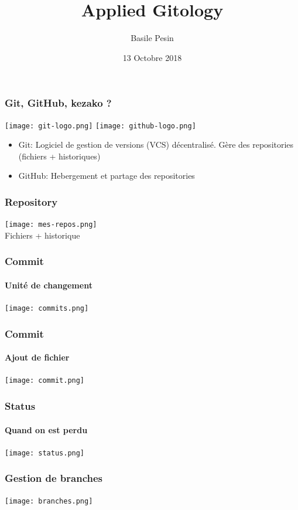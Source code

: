 \documentclass[aspectratio=169]{beamer}
\title{Applied Gitology}
\date{13 Octobre 2018}
\author{Basile Pesin}
\begin{document}
\begin{frame}
\titlepage
\end{frame}

\begin{frame}
  \frametitle{Git, GitHub, kezako ?}
  \begin{center}
    \texttt{[image: git-logo.png]}\hspace{.1\paperwidth}
    \texttt{[image: github-logo.png]}
  \end{center}
  \begin{itemize}
  \item Git: Logiciel de gestion de versions (VCS) décentralisé. Gère des repositories (fichiers + historiques)
  \item GitHub: Hebergement et partage des repositories
  \end{itemize}
\end{frame}

\begin{frame}
  \frametitle{Repository}
  \begin{center}
      \texttt{[image: mes-repos.png]}\\\vspace{.02\paperheight}
    Fichiers + historique
  \end{center}
\end{frame}

\begin{frame}
  \frametitle{Commit}
  \framesubtitle{Unité de changement}
  \begin{center}
    \texttt{[image: commits.png]}
  \end{center}
\end{frame}

\begin{frame}
  \frametitle{Commit}
  \framesubtitle{Ajout de fichier}
  \begin{center}
    \texttt{[image: commit.png]}
  \end{center}
\end{frame}

\begin{frame}
  \frametitle{Status}
  \framesubtitle{Quand on est perdu}
  \begin{center}
    \texttt{[image: status.png]}
  \end{center}
\end{frame}

\begin{frame}
  \frametitle{Gestion de branches}
  \begin{center}
    \texttt{[image: branches.png]}
  \end{center}
\end{frame}
\end{document}

